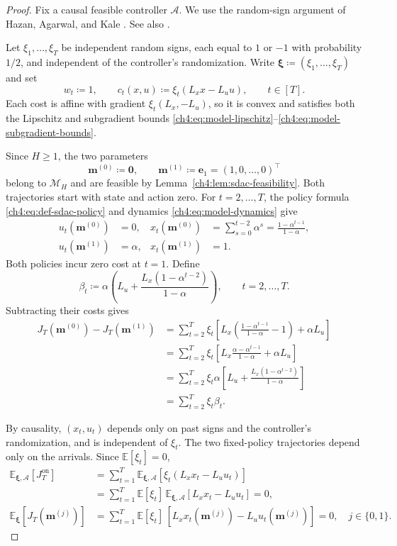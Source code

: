 \begin{proof}
Fix a causal feasible controller $\mathcal A$.
We use the random-sign argument of Hazan, Agarwal, and Kale
\cite[Sec.~2.3, footnote~3]{hazan2007logarithmic}. See also
\cite[Sec.~3.2, Thm.~3.2]{hazan2016introduction}.

Let $\xi_1,\ldots,\xi_T$ be independent random signs, each equal to $1$
or $-1$ with probability $1/2$, and independent of the controller's
randomization. Write $\boldsymbol\xi\coloneqq(\xi_1,\ldots,\xi_T)$ and set
\[
w_t\coloneqq1,\qquad c_t(x,u)\coloneqq\xi_t(L_xx-L_uu),\qquad t\in[T].
\]
Each cost is affine with gradient $\xi_t(L_x,-L_u)$, so it is convex
and satisfies both the Lipschitz and subgradient bounds
\eqref{ch4:eq:model-lipschitz}--\eqref{ch4:eq:model-subgradient-bounds}.

Since $H\ge1$, the two parameters
\[
\mathbf m^{(0)}\coloneqq\mathbf0,\qquad
\mathbf m^{(1)}\coloneqq\mathbf e_1=(1,0,\ldots,0)^\top
\]
belong to $\mathcal M_H$ and are feasible by
Lemma~\ref{ch4:lem:sdac-feasibility}. Both trajectories start with
state and action zero. For $t=2,\ldots,T$, the policy formula
\eqref{ch4:eq:def-sdac-policy} and dynamics
\eqref{ch4:eq:model-dynamics} give
\[
\begin{aligned}
u_t(\mathbf m^{(0)})&=0,
&x_t(\mathbf m^{(0)})
&=\sum_{s=0}^{t-2}\alpha^s
=\frac{1-\alpha^{t-1}}{1-\alpha},\\
u_t(\mathbf m^{(1)})&=\alpha,
&x_t(\mathbf m^{(1)})&=1.
\end{aligned}
\]
Both policies incur zero cost at $t=1$. Define
\begin{equation}
\label{ch4:eq:sdac-lower-beta}
\beta_t\coloneqq
\alpha\left(L_u+\frac{L_x(1-\alpha^{t-2})}{1-\alpha}\right),
\qquad t=2,\ldots,T.
\end{equation}
Subtracting their costs gives
\[
\begin{aligned}
J_T(\mathbf m^{(0)})-J_T(\mathbf m^{(1)})
&=\sum_{t=2}^T\xi_t
 \left[L_x\left(\frac{1-\alpha^{t-1}}{1-\alpha}-1\right)+\alpha L_u\right]\\
&=\sum_{t=2}^T\xi_t
 \left[L_x\frac{\alpha-\alpha^{t-1}}{1-\alpha}+\alpha L_u\right]\\
&=\sum_{t=2}^T\xi_t\alpha
 \left[L_u+\frac{L_x(1-\alpha^{t-2})}{1-\alpha}\right]\\
&=\sum_{t=2}^T\xi_t\beta_t.
\end{aligned}
\]

By causality, $(x_t,u_t)$ depends only on past signs and the controller's
randomization, and is independent of $\xi_t$. The two fixed-policy
trajectories depend only on the arrivals. Since $\mathbb E[\xi_t]=0$,
\[
\begin{aligned}
\mathbb E_{\boldsymbol\xi,\mathcal A}[J_T^{\mathrm{on}}]
&=\sum_{t=1}^T\mathbb E_{\boldsymbol\xi,\mathcal A}
 [\xi_t(L_xx_t-L_uu_t)]\\
&=\sum_{t=1}^T\mathbb E[\xi_t]\,
 \mathbb E_{\boldsymbol\xi,\mathcal A}[L_xx_t-L_uu_t]=0,\\
\mathbb E_{\boldsymbol\xi}[J_T(\mathbf m^{(j)})]
&=\sum_{t=1}^T\mathbb E[\xi_t]\,
 [L_xx_t(\mathbf m^{(j)})-L_uu_t(\mathbf m^{(j)})]=0,
 \quad j\in\{0,1\}.
\end{aligned}
\]


\end{proof}
